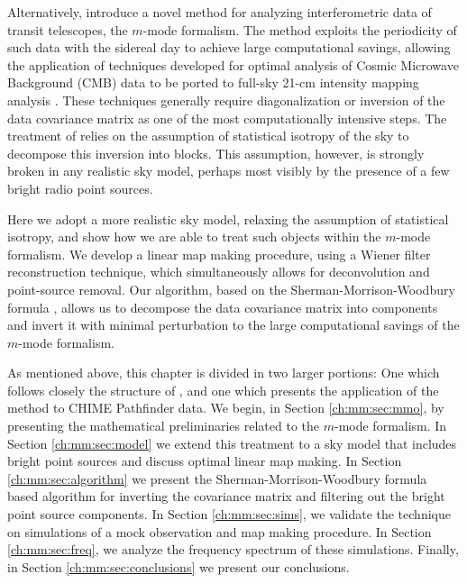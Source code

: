 Alternatively, \cite{mmodes1, mmodes2} introduce a novel method for analyzing interferometric data of transit telescopes, the $m$-mode formalism. The method exploits the periodicity of such data with the sidereal day to achieve large computational savings, allowing the application of techniques developed for optimal analysis of Cosmic Microwave Background (CMB) data \citep{bondjaffeknox, tegmark, myerscbi} to be ported to full-sky 21-cm intensity mapping analysis \citep{liutegmark}. These techniques generally require diagonalization or inversion of the data covariance matrix as one of the most computationally intensive steps. The treatment of \cite{mmodes1, mmodes2} relies on the assumption of statistical isotropy of the sky to decompose this inversion into blocks. This assumption, however, is strongly broken in any realistic sky model, perhaps most visibly by the presence of a few bright radio point sources.

Here we adopt a more realistic sky model, relaxing the assumption of statistical isotropy, and show how we are able to treat such objects within the $m$-mode formalism. We develop a linear map making procedure, using a Wiener filter reconstruction technique, which simultaneously allows for deconvolution and point-source removal. Our algorithm, based on the Sherman-Morrison-Woodbury formula \citep{smf1, smf2, woodbury}, allows us to decompose the data covariance matrix into components and invert it with minimal perturbation to the large computational savings of the $m$-mode formalism.

As mentioned above, this chapter is divided in two larger portions: One which follows closely the structure of \citep{bergeroppermann}, and one which presents the application of the method to CHIME Pathfinder data. We begin, in Section \ref{ch:mm:sec:mmo}, by presenting the mathematical preliminaries related to the $m$-mode formalism. In Section \ref{ch:mm:sec:model} we extend this treatment to a sky model that includes bright point sources and discuss optimal linear map making. In Section \ref{ch:mm:sec:algorithm} we present the Sherman-Morrison-Woodbury formula based algorithm for inverting the covariance matrix and filtering out the bright point source components. In Section \ref{ch:mm:sec:sims}, we validate the technique on simulations of a mock observation and map making procedure. In Section \ref{ch:mm:sec:freq}, we analyze the frequency spectrum of these simulations. Finally, in Section \ref{ch:mm:sec:conclusions} we present our conclusions.

